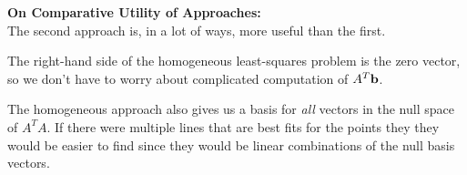 \begin{problem}
\begin{enumroman}
\begin{answer}
        \textbf{On Comparative Utility of Approaches:}\\
        The second approach is, in a lot of ways, more useful than the first.
        
        \begin{enumarabic}
          \item The right-hand side of the homogeneous least-squares
            problem is the zero vector, so we don't have to worry about
            complicated computation of $A^T \mathbf{b}$.

          \item The homogeneous approach also gives us a basis for \emph{all}
            vectors in the null space of $A^TA$.
            If there were multiple lines that are best fits for the points
            they they would be easier to find since they would be linear
            combinations of the null basis vectors.
        \end{enumarabic}
      \end{answer}
  \end{enumroman}
\end{problem}
